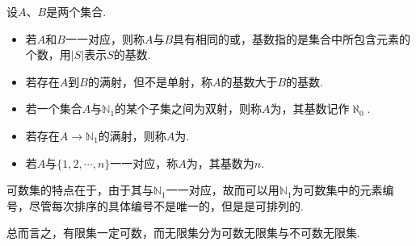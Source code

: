 \begin{definition}
    设$A$、$B$是两个集合.
    \begin{itemize}
        \item 若$A$和$B$一一对应，则称$A$与$B$具有相同的或，基数指的是集合中所包含元素的个数，用$|S|$表示$S$的基数.
        \item 若存在$A$到$B$的满射，但不是单射，称$A$的基数大于$B$的基数.
        \item 若一个集合$A$与$\mathbb{N}_1$的某个子集之间为双射，则称$A$为，其基数记作$\aleph_0$.
        \item 若存在$A \to \mathbb{N}_1$的满射，则称$A$为.
        \item 若$A$与$\{1,2,\cdots,n\}$一一对应，称$A$为，其基数为$n$.
    \end{itemize}
\end{definition}

可数集的特点在于，由于其与$\mathbb{N}_1$一一对应，故而可以用$\mathbb{N}_1$为可数集中的元素编号，尽管每次排序的具体编号不是唯一的，但是是可排列的.

总而言之，有限集一定可数，而无限集分为可数无限集与不可数无限集.

